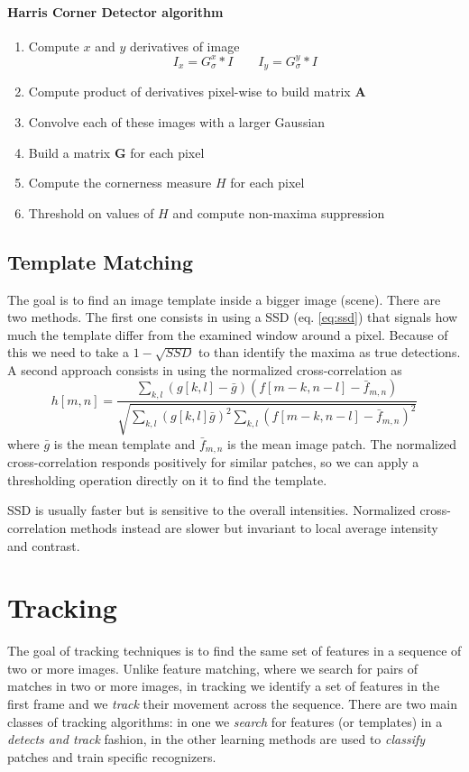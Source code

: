 \documentclass[a4paper,twocolumn]{article}
\begin{document}
\paragraph{Harris Corner Detector algorithm}
\begin{enumerate}
	\item Compute $x$ and $y$ derivatives of image
		$$I_x=G_{\sigma}^x * I \qquad I_y = G_{\sigma}^y * I$$
	\item Compute product of derivatives pixel-wise to build matrix $\mathbf{A}$
	\item Convolve each of these images with a larger Gaussian
	\item Build a matrix $\mathbf{G}$ for each pixel
	\item Compute the cornerness measure $H$ for each pixel
	\item Threshold on values of $H$ and compute non-maxima suppression
\end{enumerate}


\subsection{Template Matching}
The goal is to find an image template inside a bigger image (scene). There are
two methods. The first one consists in using a SSD (eq. \ref{eq:ssd}) that signals how much the
template differ from the examined window around a pixel. Because of this we need
to take a $1 - \sqrt{SSD}$ to than identify the maxima as true detections.
A second approach consists in using the normalized cross-correlation as
\begin{equation} \label{eq:xcorr}
	h[m,n]=\frac{\sum_{k,l}(g[k,l]-\bar{g})(f[m-k,n-l]-\bar{f}_{m,n})}
		{\sqrt{\sum_{k,l}(g[k,l]\bar{g})^2\sum_{k,l}(f[m-k,n-l]-\bar{f}_{m,n})^2}}
\end{equation}
where $\bar{g}$ is the mean template and $\bar{f}_{m,n}$ is the mean image patch.
The normalized cross-correlation responds positively for similar patches, so we
can apply a thresholding operation directly on it to find the template.

SSD is usually faster but is sensitive to the overall intensities. Normalized
cross-correlation methods instead are slower but invariant to local average
intensity and contrast.



\section{Tracking}
The goal of tracking techniques is to find the same set of features in a
sequence of two or more images. Unlike feature matching, where we search for
pairs of matches in two or more images, in tracking we identify a set of
features in the first frame and we \textit{track} their movement across the
sequence. There are two main classes of tracking algorithms: in one we
\textit{search} for features (or templates) in a \textit{detects and track}
fashion, in the other learning methods are used to \textit{classify} patches and
train specific recognizers.
\end{document}
